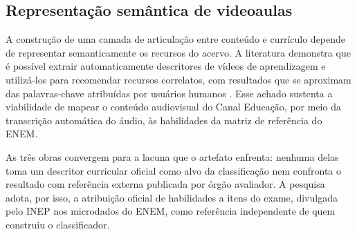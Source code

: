 \subsection{Representação semântica de videoaulas}

A construção de uma camada de articulação entre conteúdo e currículo depende de
representar semanticamente os recursos do acervo. A literatura demonstra que é
possível extrair automaticamente descritores de vídeos de aprendizagem e
utilizá-los para recomendar recursos correlatos, com resultados que se
aproximam das palavras-chave atribuídas por usuários humanos
\parencite{schulten2020}. Esse achado sustenta a viabilidade de mapear o
conteúdo audiovisual do Canal Educação, por meio da transcrição automática do
áudio, às habilidades da matriz de referência do ENEM.

As três obras convergem para a lacuna que o artefato enfrenta: nenhuma delas
toma um descritor curricular oficial como alvo da classificação nem confronta o
resultado com referência externa publicada por órgão avaliador. A pesquisa
adota, por isso, a atribuição oficial de habilidades a itens do exame,
divulgada pelo INEP nos microdados do ENEM, como referência independente de
quem construiu o classificador.
